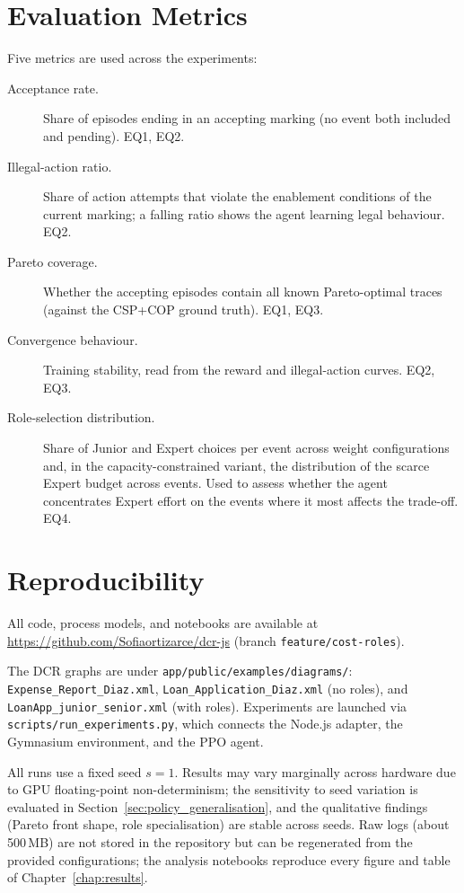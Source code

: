 \section{Evaluation Metrics}
\label{sec:metrics}

Five metrics are used across the experiments:

\begin{description}
    \item[Acceptance rate.] Share of episodes ending in an accepting
    marking (no event both included and pending). EQ1, EQ2.

    \item[Illegal-action ratio.] Share of action attempts that violate
    the enablement conditions of the current marking; a falling ratio
    shows the agent learning legal behaviour. EQ2.

    \item[Pareto coverage.] Whether the accepting episodes contain all
    known Pareto-optimal traces (against the CSP+COP ground truth).
    EQ1, EQ3.

    \item[Convergence behaviour.] Training stability, read from the
    reward and illegal-action curves. EQ2, EQ3.

    \item[Role-selection distribution.] Share of Junior and Expert
    choices per event across weight configurations and, in the
    capacity-constrained variant, the distribution of the scarce Expert
    budget across events. Used to assess whether the agent concentrates
    Expert effort on the events where it most affects the trade-off.
    EQ4.
\end{description}

\section{Reproducibility}
\label{sec:reproducibility}

All code, process models, and notebooks are available at
\url{https://github.com/Sofiaortizarce/dcr-js} (branch
\texttt{feature/cost-roles}).

The \ac{DCR} graphs are under
\texttt{app/public/examples/diagrams/}: \texttt{Expense\_Report\_Diaz.xml},
\texttt{Loan\_Application\_Diaz.xml} (no roles), and
\texttt{LoanApp\_junior\_senior.xml} (with roles). Experiments are
launched via \texttt{scripts/run\_experiments.py}, which connects the
Node.js adapter, the Gymnasium environment, and the \ac{PPO} agent.

All runs use a fixed seed $s = 1$. Results may vary marginally across
hardware due to GPU floating-point non-determinism; the sensitivity to
seed variation is evaluated in
Section~\ref{sec:policy_generalisation}, and the qualitative findings
(Pareto front shape, role specialisation) are stable across seeds. Raw
logs (about 500\,MB) are not stored in the repository but can be
regenerated from the provided configurations; the analysis notebooks
reproduce every figure and table of Chapter~\ref{chap:results}.
